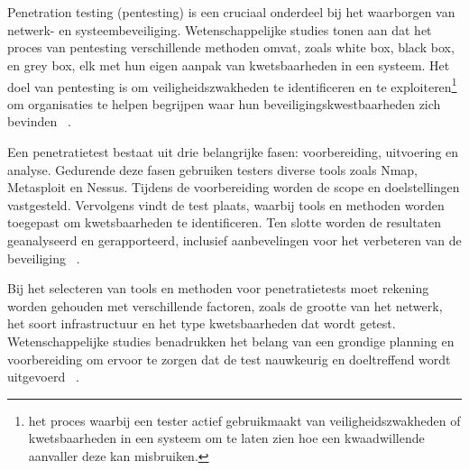 \chapter{}%
\label{ch:stand-van-zaken}


\section{}
\label{sec:pentesting}
Penetration testing (pentesting) is een cruciaal onderdeel bij het waarborgen van netwerk- en systeembeveiliging. 
Wetenschappelijke studies tonen aan dat het proces van pentesting verschillende methoden omvat, zoals white box, 
black box, en grey box, elk met hun eigen aanpak van kwetsbaarheden in een systeem. Het doel van pentesting is om 
veiligheidszwakheden te identificeren en te exploiteren\footnote{het proces waarbij een tester actief gebruikmaakt 
van veiligheidszwakheden of kwetsbaarheden in een systeem om te laten zien hoe een kwaadwillende aanvaller deze kan misbruiken.} 
om organisaties te helpen begrijpen waar hun beveiligingskwestbaarheden zich bevinden ~\autocite{Alhamed2023}.

Een penetratietest bestaat uit drie belangrijke fasen: voorbereiding, uitvoering en analyse. Gedurende deze fasen gebruiken 
testers diverse tools zoals Nmap, Metasploit en Nessus. Tijdens de voorbereiding worden de scope en doelstellingen vastgesteld. 
Vervolgens vindt de test plaats, waarbij tools en methoden worden toegepast om kwetsbaarheden te identificeren. 
Ten slotte worden de resultaten geanalyseerd en gerapporteerd, inclusief aanbevelingen voor het verbeteren van de beveiliging 
~\autocite{Sarker2023}.

Bij het selecteren van tools en methoden voor penetratietests moet rekening worden gehouden met verschillende factoren, zoals de 
grootte van het netwerk, het soort infrastructuur en het type kwetsbaarheden dat wordt getest. Wetenschappelijke studies 
benadrukken het belang van een grondige planning en voorbereiding om ervoor te zorgen dat de test nauwkeurig en doeltreffend 
wordt uitgevoerd ~\autocite{Alhamed2023}.

